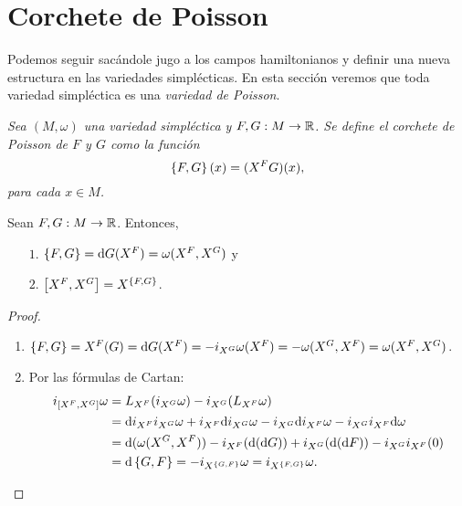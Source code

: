 \section{Corchete de Poisson}\label{sec:poisson}
Podemos seguir sacándole jugo a los campos hamiltonianos y definir una nueva estructura en las variedades simplécticas. En esta sección veremos que toda variedad simpléctica es una \emph{variedad de Poisson}.

\begin{defn}
  \em
  Sea $(M,\omega)$ una variedad simpléctica y $F,G: M \rightarrow \mathbb{R}$. Se define el \emph{corchete de Poisson de $F$ y $G$} como la función
\begin{equation*}
  \left\lbrace F,G\right\rbrace(x) = (X^F G)(x),
\end{equation*}
para cada $x \in M$.
\end{defn}
\begin{prop}\leavevmode
  Sean $F,G:M\rightarrow \mathbb{R}$. Entonces,
  \begin{enumerate}
    \item[$1$.] $\left\lbrace F,G\right\rbrace = \mathrm{d} G (X^F)= \omega(X^F, X^G)$ y
    \item[$2$.] $\left[X^F,X^G\right] = X^{\left\lbrace F,G\right\rbrace}$. \label{proppoisson}
  \end{enumerate}
\end{prop}
\begin{proof}\leavevmode
  \begin{enumerate}
    \item $\left\lbrace F,G\right\rbrace=X^F(G)=\mathrm{d} G(X^F) = -i_{X^G}\omega(X^F)=-\omega(X^G,X^F)=\omega(X^F,X^G)$.
    \item Por las fórmulas de Cartan:
      \begin{align*}
	i_{\left[X^F,X^G\right]} \omega & =  L_{X^F}(i_{X^G}\omega) - i_{X^G}(L_{X^F} \omega) \\ 
	& = \mathrm{d} i_{X^F}i_{X^G}\omega + i_{X^F}\mathrm{d} i_{X^G}\omega - i_{X^G}\mathrm{d} i_{X^F}\omega - i_{X^G}i_{X^F}\mathrm{d} \omega \\
	& = \mathrm{d} (\omega(X^G,X^F)) - i_{X^F}(\mathrm{d}(\mathrm{d} G)) + i_{X^G}(\mathrm{d} (\mathrm{d} F)) - i_{X^G}i_{X^F}(0) \\
	& = \mathrm{d} \left\lbrace G,F\right\rbrace = -i_{X^{\left\lbrace G,F\right\rbrace}}\omega=i_{X^{\left\lbrace F,G\right\rbrace}}\omega.
      \end{align*}
  \end{enumerate}
\end{proof}

